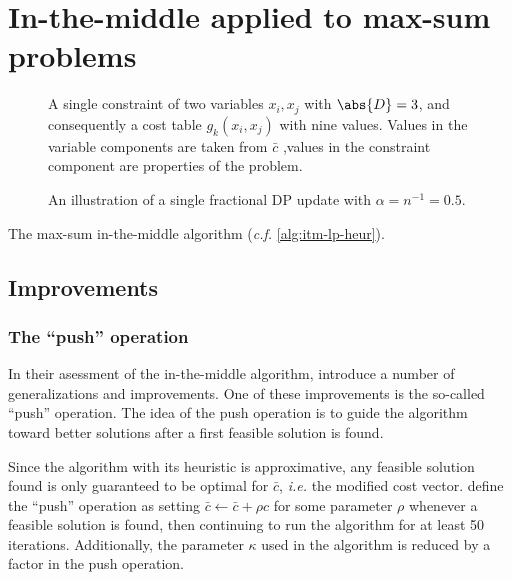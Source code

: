 \section{In-the-middle applied to max-sum problems}

\begin{figure}
	\centering
	
	\caption{A single constraint of two variables \(x_i,x_j\) with \(\abs{D}=3\), and consequently a cost table \(g_k(x_i,x_j)\) with nine values. Values in the variable components are taken from \(\bar{c}\) ,values in the constraint component are properties of the problem.}
\end{figure}


\begin{figure}
	\centering
	\hfil
	\hfil
	\caption{An illustration of a single fractional DP update with \(\alpha = n^{-1} = \num{0.5}\).}
\end{figure}

\begin{algorithm}[tbp]

	\caption{The max-sum in-the-middle algorithm (\emph{c.f.} \cref{alg:itm-lp-heur}).}
	\label{alg:itm-max-sum}
\end{algorithm}

\subsection{Improvements}


\subsubsection{The \enquote{push} operation}
In their asessment of the in-the-middle algorithm, \textcite{Bastert10} introduce a number of generalizations and improvements.
One of these improvements is the so-called \enquote{push} operation.
The idea of the push operation is to guide the algorithm toward better solutions after a first feasible solution is found.

Since the algorithm with its heuristic is approximative, any feasible solution found is only guaranteed to be optimal for \(\bar{c}\), \emph{i.e.} the modified cost vector.
 define the \enquote{push} operation \parencite[\pno~100]{Bastert10} as setting \(\bar{c} \leftarrow \bar{c} + \rho c\) for some parameter \(\rho\) whenever a feasible solution is found, then continuing to run the algorithm for at least 50 iterations.
Additionally, the parameter \(\kappa\) used in the algorithm is reduced by a factor in the push operation.

